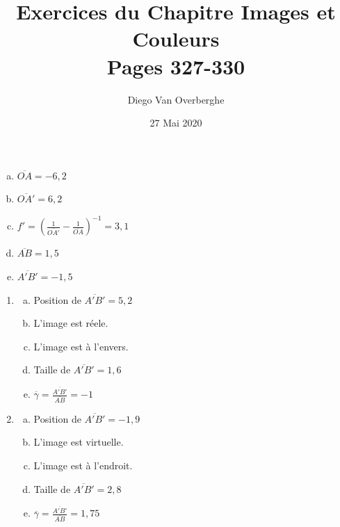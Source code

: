 \documentclass[12pt, a4paper]{article}
\begin{document}
    \title{Exercices du Chapitre Images et Couleurs \\ \Large{Pages 327-330}}
    \author{Diego Van Overberghe}
    \date{27 Mai 2020}
    \maketitle

    \begin{Exercise}[number={11}]
        \begin{enumerate}[a.]
            \item   $\overline{OA}=-6{,}2$
            \item   $\overline{OA'}=6{,}2$
            \item   $f'=\left(\frac{1}{\overline{OA'}}-\frac{1}{\overline{OA}}\right)^{-1}=3{,}1$
            \item   $\overline{AB}=1{,}5$
            \item   $\overline{A'B'}=-1{,}5$
        \end{enumerate}
    \end{Exercise}

    \begin{Exercise}[number={14}]
        \begin{enumerate}[1.]
            \item   \begin{enumerate}[a.]
                        \item	Position de $\overline{A'B'}=5{,}2$
                        \item   L'image est réele.
                        \item   L'image est à l'envers.
                        \item   Taille de $\overline{A'B'}=1{,}6$
                        \item   $\overline{\gamma}=\frac{\overline{A'B'}}{\overline{AB}}=-1$
                    \end{enumerate}
            \item   \begin{enumerate}[a.]
                        \item	Position de $\overline{A'B'}=-1{,}9$
                        \item   L'image est virtuelle.
                        \item   L'image est à l'endroit.
                        \item   Taille de $\overline{A'B'}=2{,}8$
                        \item   $\overline{\gamma}=\frac{\overline{A'B'}}{\overline{AB}}=1{,}75$
                    \end{enumerate}
        \end{enumerate}
    \end{Exercise}
\end{document}
